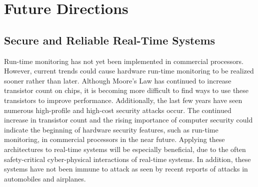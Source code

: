 
\section{Future Directions}

\subsection{Secure and Reliable Real-Time Systems}

Run-time monitoring has not yet been implemented in commercial processors.
However, current trends could cause hardware run-time monitoring to be realized
sooner rather than later. Although Moore's Law has continued to increase
transistor count on chips, it is becoming more difficult to find ways to use
these transistors to improve performance. Additionally, the last few years have
seen numerous high-profile and high-cost security attacks occur. 
The continued
increase in transistor count and the rising importance of computer security
could indicate the beginning of hardware security features, such as run-time
monitoring, in commercial processors in the near future. Applying these
architectures to real-time systems will be especially beneficial, due to the
often safety-critical cyber-physical interactions of real-time systems.  In
addition, these systems have not been immune to attack as seen by recent
reports of attacks in automobiles and airplanes. 


